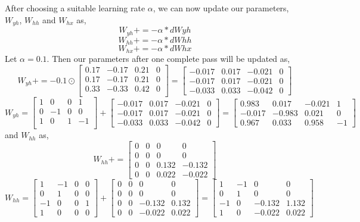 \documentclass[12pt,letterpaper]{article}
\begin{document}
After choosing a suitable learning rate $\alpha$,
we can now update our parameters, $W_{yh}$, $W_{hh}$ and $W_{hx}$ as,
\[
W_{yh} += -\alpha*dWyh
\]
\[
W_{hh} +=   -\alpha*dWhh
\]
\[
W_{hx} += -\alpha*dWhx
\]
Let $\alpha = 0.1$.
Then our parameters after one complete pass will be updated as,
\[
W_{yh} +=   -0.1\odot\begin{bmatrix}
0.17&	-0.17&	0.21&	0\\
0.17	&-0.17	&0.21&	0\\
0.33&	-0.33&	0.42&	0\\ 
\end{bmatrix} = \begin{bmatrix}
-0.017&0.017&-0.021&0\\
-0.017&0.017&-0.021&0\\
-0.033&0.033&-0.042&0
\end{bmatrix}
\]
\[
W_{yh} = \begin{bmatrix}
1&0&0&1\\
0&-1&0&0\\
1&0&1&-1\\
\end{bmatrix}+\begin{bmatrix}
-0.017&0.017&-0.021&0\\
-0.017&0.017&-0.021&0\\
-0.033&0.033&-0.042&0
\end{bmatrix} = \begin{bmatrix}
0.983&0.017&-0.021&1\\
-0.017&-0.983&0.021&0\\
0.967&0.033&0.958&-1
\end{bmatrix}
\]
and $W_{hh}$ as,
\[
W_{hh} += \begin{bmatrix}
0&0&0&0\\
0&0&0&0\\
0&0&0.132&-0.132\\
0&0&0.022&-0.022
\end{bmatrix} 
\]
\[
W_{hh} = \begin{bmatrix}
1 &-1&0&0\\
0&1&0&0\\
-1&0&0&1\\
1&0&0&0
\end{bmatrix}+\begin{bmatrix}
0&0&0&0\\
0&0&0&0\\
0&0&-0.132&0.132\\
0&0&-0.022&0.022
\end{bmatrix} = \begin{bmatrix}
1&-1&0&0\\
0&1&0&0\\
-1&0&-0.132&1.132\\
1&0&-0.022&0.022
\end{bmatrix}
\]
\end{document}

